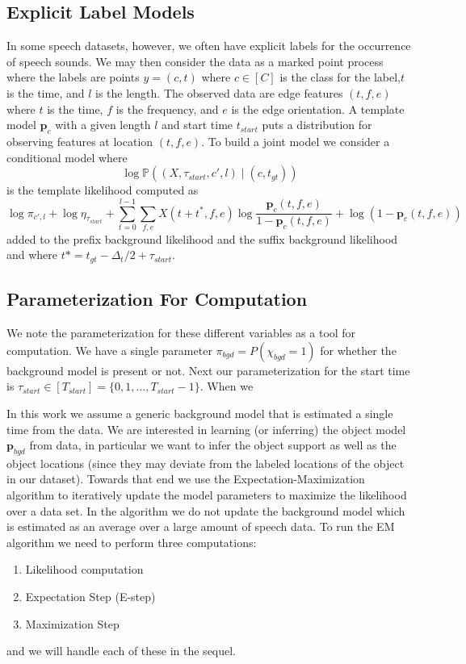 \documentclass{article}
\begin{document}
\subsection{Explicit Label Models}

In some speech datasets, however, we often have explicit labels for the 
occurrence of speech sounds. We may then consider the data as a marked point process where the labels are points $y=(c,t)$ where $c\in [C]$ is the class
for the label,$t$ is the time, and $l$ is the length.  The observed
data are edge features $(t,f,e)$ where $t$ is the time, $f$ is the frequency,
and $e$ is the edge orientation. A template model $\mathbf{p}_c$ with a
given length $l$ and start time $t_{start}$ puts a distribution for observing
 features at location $(t,f,e)$.  To build a joint model we consider
a conditional model where $$\log\mathbb{P}((X,\tau_{start},c',l)\mid (c,t_{gt}))$$
 is the template likelihood computed as
$$
\log\pi_{c',l}+\log\eta_{\tau_{start}}+\sum_{t=0}^{l-1}\sum_{f,e} X(t+t^*,f,e)\log\frac{\mathbf{p}_c(t,f,e)}{1-\mathbf{p}_c(t,f,e)} + \log(1- \mathbf{p}_c(t,f,e))
$$
added to the prefix background likelihood and the suffix background likelihood and
where $t* = t_{gt}-\Delta_{t}/2+\tau_{start}$.

\subsection{Parameterization For Computation}



We note the parameterization for these different variables as a tool for
computation. We have a single parameter $\pi_{bgd}=P(\chi_{bgd}=1)$ for whether
the background model is present or not.  Next our parameterization for
the start time is $\tau_{start}\in [T_{start}]=\{0,1,\ldots,T_{start}-1\}$.
When we 

In this work we assume a generic background model that is estimated a single time from the data. We are interested in learning (or inferring) the object
model $\mathbf{p}_{bgd}$ from data, in particular we want to infer the object support as well as the object locations (since they may deviate from the labeled
locations of the object in our dataset).  Towards that end we use the Expectation-Maximization algorithm to iteratively update the model parameters
to maximize the likelihood over a data set.  In the algorithm we do not update the background model which is estimated as an average over a large amount of
speech data.  To run the EM algorithm we need to perform three computations:
\begin{enumerate}
  \item Likelihood computation
  \item Expectation Step (E-step)
  \item Maximization Step
\end{enumerate}
and we will handle each of these in the sequel.  
\end{document}
